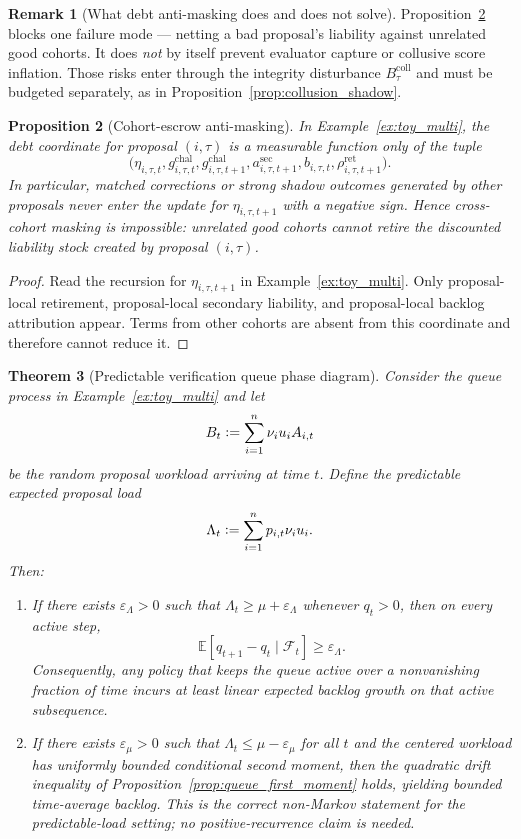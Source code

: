 \documentclass[11pt]{article}
\newtheorem{theorem}{Theorem}[section]
\newtheorem{proposition}[theorem]{Proposition}
\theoremstyle{definition}
\newtheorem{remark}[theorem]{Remark}
\newcommand{\E}{\mathbb{E}}
\newcommand{\1}{\mathbf{1}}
\newcommand{\eps}{\varepsilon}
\newcommand{\Defeq}{\vcentcolon=}
\begin{document}
\begin{remark}[What debt anti-masking does and does not solve]
Proposition~\ref{prop:anti_masking} blocks one failure mode --- netting a bad proposal's liability against unrelated good cohorts. It does \emph{not} by itself prevent evaluator capture or collusive score inflation. Those risks enter through the integrity disturbance $B_\tau^{\mathrm{coll}}$ and must be budgeted separately, as in Proposition~\ref{prop:collusion_shadow}.
\end{remark}

\begin{proposition}[Cohort-escrow anti-masking]\label{prop:anti_masking}
In Example~\ref{ex:toy_multi}, the debt coordinate for proposal $(i,\tau)$ is a measurable function only of the tuple
\[
\bigl(\eta_{i,\tau,t},g_{i,\tau,t}^{\mathrm{chal}},g_{i,\tau,t+1}^{\mathrm{chal}},a_{i,\tau,t+1}^{\mathrm{sec}},b_{i,\tau,t},\rho_{i,\tau,t+1}^{\mathrm{ret}}\bigr).
\]
In particular, matched corrections or strong shadow outcomes generated by other proposals never enter the update for $\eta_{i,\tau,t+1}$ with a negative sign. Hence cross-cohort masking is impossible: unrelated good cohorts cannot retire the discounted liability stock created by proposal $(i,\tau)$.
\end{proposition}

\begin{proof}
Read the recursion for $\eta_{i,\tau,t+1}$ in Example~\ref{ex:toy_multi}. Only proposal-local retirement, proposal-local secondary liability, and proposal-local backlog attribution appear. Terms from other cohorts are absent from this coordinate and therefore cannot reduce it.
\end{proof}
\begin{theorem}[Predictable verification queue phase diagram]\label{thm:toym_queue}
Consider the queue process in Example~\ref{ex:toy_multi} and let
\[
B_t\Defeq \sum_{i=1}^n \nu_i u_i A_{i,t}
\]
be the random proposal workload arriving at time $t$. Define the predictable expected proposal load
\[
\Lambda_t\Defeq \sum_{i=1}^n p_{i,t}\nu_i u_i.
\]
Then:
\begin{enumerate}[label=(\roman*), leftmargin=2em]
  \item If there exists $\eps_\Lambda>0$ such that $\Lambda_t\ge \mu+\eps_\Lambda$ whenever $q_t>0$, then on every active step,
  \[
  \E[q_{t+1}-q_t\mid \mathcal F_t] \ge \eps_\Lambda.
  \]
  Consequently, any policy that keeps the queue active over a nonvanishing fraction of time incurs at least linear expected backlog growth on that active subsequence.
  \item If there exists $\eps_\mu>0$ such that $\Lambda_t\le \mu-\eps_\mu$ for all $t$ and the centered workload has uniformly bounded conditional second moment, then the quadratic drift inequality of Proposition~\ref{prop:queue_first_moment} holds, yielding bounded time-average backlog. This is the correct non-Markov statement for the predictable-load setting; no positive-recurrence claim is needed.
\end{enumerate}
\end{theorem}
\end{document}
